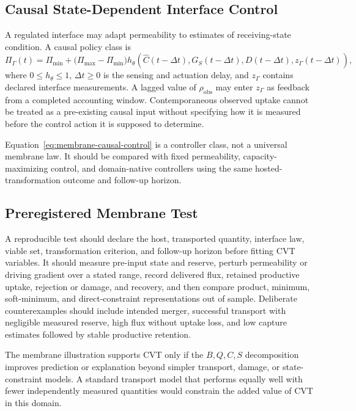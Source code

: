 \documentclass[11pt]{article}
\begin{document}
\subsection{Causal State-Dependent Interface Control}

A regulated interface may adapt permeability to estimates of receiving-state condition. A causal policy class is
\begin{equation}
    \Pi_{\Gamma}(t)
    =
    \Pi_{\min}
    +
    \bigl(\Pi_{\max}-\Pi_{\min}\bigr)
    h_{\theta}\!\left(
        \widehat C(t-\Delta t),
        G_S(t-\Delta t),
        D(t-\Delta t),
        z_{\Gamma}(t-\Delta t)
    \right),
    \label{eq:membrane-causal-control}
\end{equation}
where \(0\leq h_{\theta}\leq1\), \(\Delta t\geq0\) is the sensing and actuation delay, and \(z_{\Gamma}\) contains declared interface measurements. A lagged value of \(\rho_{\mathrm{obs}}\) may enter \(z_{\Gamma}\) as feedback from a completed accounting window. Contemporaneous observed uptake cannot be treated as a pre-existing causal input without specifying how it is measured before the control action it is supposed to determine.

Equation~\eqref{eq:membrane-causal-control} is a controller class, not a universal membrane law. It should be compared with fixed permeability, capacity-maximizing control, and domain-native controllers using the same hosted-transformation outcome and follow-up horizon.

\subsection{Preregistered Membrane Test}

A reproducible test should declare the host, transported quantity, interface law, viable set, transformation criterion, and follow-up horizon before fitting CVT variables. It should measure pre-input state and reserve, perturb permeability or driving gradient over a stated range, record delivered flux, retained productive uptake, rejection or damage, and recovery, and then compare product, minimum, soft-minimum, and direct-constraint representations out of sample. Deliberate counterexamples should include intended merger, successful transport with negligible measured reserve, high flux without uptake loss, and low capture estimates followed by stable productive retention.

The membrane illustration supports CVT only if the \(B,Q,C,S\) decomposition improves prediction or explanation beyond simpler transport, damage, or state-constraint models. A standard transport model that performs equally well with fewer independently measured quantities would constrain the added value of CVT in this domain.
\end{document}
